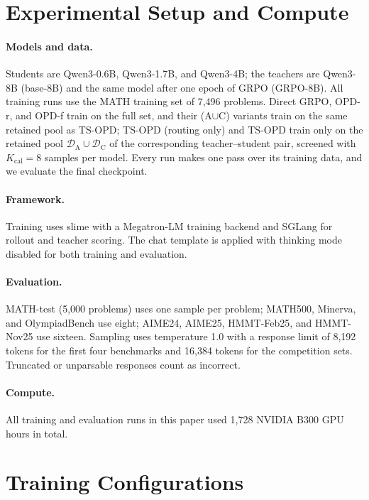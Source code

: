 \documentclass[10pt]{article}
\newcommand{\tsopd}{TS-OPD}
\begin{document}
\section{Experimental Setup and Compute}
\label{app:setup}

\paragraph{Models and data.}
Students are Qwen3-0.6B, Qwen3-1.7B, and Qwen3-4B; the teachers are Qwen3-8B
(base-8B) and the same model after one epoch of GRPO (GRPO-8B). All training
runs use the MATH training set of 7{,}496 problems. Direct GRPO, OPD-r, and
OPD-f train on the full set, and their (A$\cup$C) variants train on the same
retained pool as \tsopd{}; \tsopd{} (routing only) and \tsopd{} train only on the
retained pool $\mathcal D_{\mathrm A}\cup\mathcal D_{\mathrm C}$ of the
corresponding teacher--student pair, screened with $K_{\mathrm{cal}}=8$
samples per model. Every run makes one pass over its training data, and we
evaluate the final checkpoint.

\paragraph{Framework.}
Training uses slime with a Megatron-LM training backend and SGLang for
rollout and teacher scoring. The chat template is applied with thinking mode
disabled for both training and evaluation.

\paragraph{Evaluation.}
MATH-test (5{,}000 problems) uses one sample per problem; MATH500, Minerva, and
OlympiadBench use eight; AIME24, AIME25, HMMT-Feb25, and HMMT-Nov25 use
sixteen. Sampling uses temperature 1.0 with a response limit of 8{,}192 tokens
for the first four benchmarks and 16{,}384 tokens for the competition sets.
Truncated or unparsable responses count as incorrect.

\paragraph{Compute.}
All training and evaluation runs in this paper used 1{,}728 NVIDIA B300 GPU
hours in total.

\section{Training Configurations}
\label{app:config}
\end{document}
